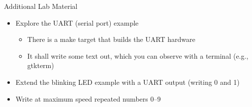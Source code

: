 \documentclass[xcolor=pdflatex,dvipsnames,table]{beamer}
\begin{document}
\begin{frame}[fragile]{Additional Lab Material}
\begin{itemize}
\item Explore the UART (serial port) example
\begin{itemize}
\item There is a make target that builds the UART hardware
\item It shall write some text out, which you can observe with a terminal (e.g., gtkterm)
\end{itemize}
\item Extend the blinking LED example with a UART output (writing 0 and 1)
\item Write at maximum speed repeated numbers 0--9
\end{itemize}
\end{frame}
\end{document}
